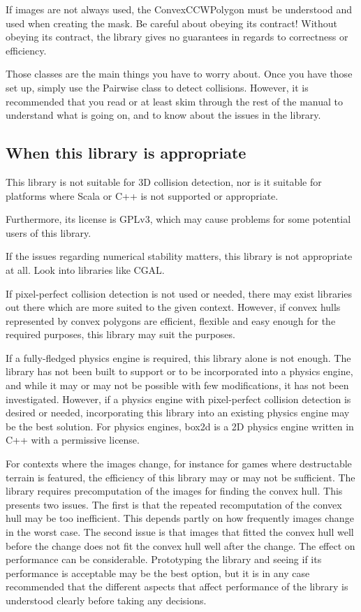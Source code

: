 If images are not always used, the ConvexCCWPolygon must be
understood and used when creating the mask.
Be careful about obeying its contract! Without obeying
its contract, the library gives no guarantees in regards
to correctness or efficiency.

Those classes are the main things you have to worry about.
Once you have those set up, simply use the Pairwise
class to detect collisions. However, it is recommended
that you read or at least skim through the rest of the
manual to understand what is going on, and to know
about the issues in the library.

\subsection{When this library is appropriate}

This library is not suitable for 3D collision detection,
nor is it suitable for platforms where Scala or C++ is not
supported or appropriate.

Furthermore, its license is GPLv3, which may cause problems for some potential users
of this library.

If the issues regarding numerical stability matters, this library is not appropriate at all.
Look into libraries like CGAL.

If pixel-perfect collision detection is not used or needed, there may exist libraries
out there which are more suited to the given context. However, if convex hulls
represented by convex polygons are efficient, flexible and easy enough for the required
purposes, this library may suit the purposes.

If a fully-fledged physics engine is required, this library alone is not enough.
The library has not been built to support or to be incorporated into a physics engine,
and while it may or may not be possible with few modifications, it has not been investigated.
However, if a physics engine with pixel-perfect collision detection is desired or needed,
incorporating this library into an existing physics engine may be the best solution.
For physics engines, box2d is a 2D physics engine written in C++ with a permissive license.

For contexts where the images change, for instance for games where destructable terrain
is featured, the efficiency of this library may or may not be sufficient. The library
requires precomputation of the images for finding the convex hull. This presents two
issues. The first is that the repeated recomputation of the convex hull may be too inefficient.
This depends partly on how frequently images change in the worst case.
The second issue is that images that fitted the convex hull well before the change
does not fit the convex hull well after the change. The effect on performance can be considerable.
Prototyping the library and seeing if its performance is acceptable may be the best option,
but it is in any case recommended that the different aspects that affect performance of the library
is understood clearly before taking any decisions.

